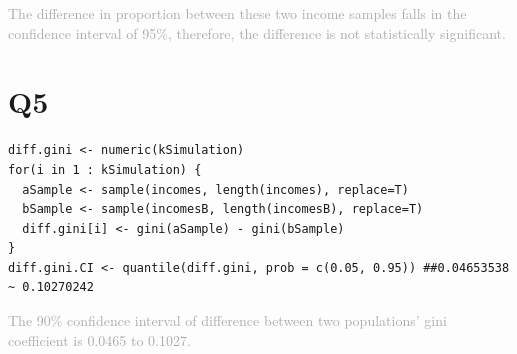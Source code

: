 \documentclass[12pt]{article}
\begin{document}
\noindent \textcolor{darkgray}{The difference in proportion between these two income samples falls in the confidence interval of 95$\%$, therefore, the difference is not statistically significant.}

\section*{Q5} 
\begin{verbatim}
diff.gini <- numeric(kSimulation)
for(i in 1 : kSimulation) {
  aSample <- sample(incomes, length(incomes), replace=T)
  bSample <- sample(incomesB, length(incomesB), replace=T)
  diff.gini[i] <- gini(aSample) - gini(bSample)
}
diff.gini.CI <- quantile(diff.gini, prob = c(0.05, 0.95)) ##0.04653538 ~ 0.10270242
\end{verbatim}

\noindent \textcolor{darkgray}{The 90$\%$ confidence interval of difference between two populations' gini coefficient is 0.0465 to 0.1027.}
\end{document}
